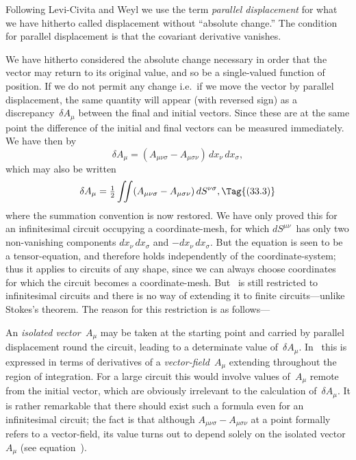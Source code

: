 \documentclass[12pt]{book}
\begin{document}
Following Levi\hyp{}Civita and Weyl we use the term \emph{parallel displacement} for
%
%
what we have hitherto called displacement without ``absolute change.'' The
condition for parallel displacement is that the covariant derivative vanishes.

We have hitherto considered the absolute change necessary in order that
the vector may return to its original value, and so be a single\hyp{}valued function
of position. If we do not permit any change  i.e.\ if we move the vector
by parallel displacement, the same quantity will appear (with reversed sign)
as a discrepancy~$\delta A_{\mu}$ between the final and initial vectors. Since these are at
the same point the difference of the initial and final vectors can be measured
immediately. We have then by~
\[
\delta A_{\mu} = (A_{\mu\nu\sigma} - A_{\mu\sigma\nu})\, dx_{\nu}\, dx_{\sigma},
\]
which may also be written
\[
\delta A_{\mu} = \tfrac{1}{2} \iint (A_{\mu\nu\sigma} - A_{\mu\sigma\nu})\, dS^{\nu\sigma},
\Tag{(33.3)}
\]
where the summation convention is now restored. We have only proved this
for an infinitesimal circuit occupying a coordinate\hyp{}mesh, for which $dS^{\mu\nu}$~has
only two non\hyp{}vanishing components $dx_{\nu}\, dx_{\sigma}$ and $-dx_{\nu}\, dx_{\sigma}$. But the equation
is seen to be a tensor\hyp{}equation, and therefore holds independently of the
coordinate\hyp{}system; thus it applies to circuits of any shape, since we can always
choose coordinates for which the circuit becomes a coordinate\hyp{}mesh. But ~is
still restricted to infinitesimal circuits and there is no way of extending it
to finite circuits---unlike Stokes's theorem. The reason for this restriction is as
follows---

An \emph{isolated vector~$A_{\mu}$} may be taken at the starting point and carried by
parallel displacement round the circuit, leading to a determinate value of~$\delta A_{\mu}$.
%
%
In~ this is expressed in terms of derivatives of a \emph{vector\hyp{}field~$A_{\mu}$} extending
throughout the region of integration. For a large circuit this would involve
values of~$A_{\mu}$ remote from the initial vector, which are obviously irrelevant to
the calculation of~$\delta A_{\mu}$. It is rather remarkable that there should exist such
a formula even for an infinitesimal circuit; the fact is that although $A_{\mu\nu\sigma} - A_{\mu\sigma\nu}$
at a point formally refers to a vector\hyp{}field, its value turns out to depend solely
on the isolated vector~$A_{\mu}$ (see equation~).
\end{document}
